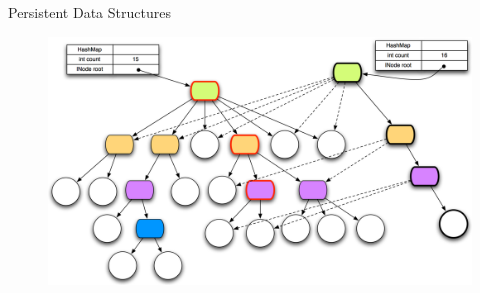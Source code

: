 \documentclass[compress]{beamer}
\begin{document}
	\section*{}
	
	\frame{\titlepage}
	
	\begin{frame}{Persistent Data Structures}
			\begin{figure}
				\centering
				
				\includegraphics[scale=0.25]{../document/figures/diagrams/persistent-data-structure}
			\end{figure}
		\end{frame}
\end{document}
